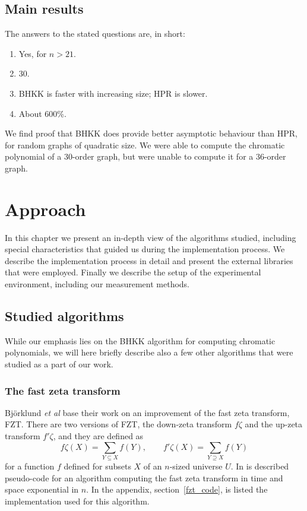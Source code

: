 \documentclass{cslthse-msc}
\begin{document}
\section{Main results}
The answers to the stated questions are, in short:

\begin{enumerate}
 \item Yes, for $n > 21$.
 \item 30.
 \item BHKK is faster with increasing size; HPR is slower.
 \item About 600\%.
\end{enumerate}

We find proof that BHKK does provide better asymptotic behaviour than HPR, for random graphs of quadratic size. We were able to compute the chromatic polynomial of a 30-order graph, but were unable to compute it for a 36-order graph.

\chapter{Approach}
In this chapter we present an in-depth view of the algorithms studied, including special characteristics that guided us during the implementation process. We describe the implementation process in detail and present the external libraries that were employed. Finally we describe the setup of the experimental environment, including our measurement methods.


\section{Studied algorithms}
While our emphasis lies on the BHKK algorithm for computing chromatic polynomials, we will here briefly describe also a few other algorithms that were studied as a part of our work.

\subsection{The fast zeta transform}\label{fzt_algorithm}
Björklund \emph{et al} \cite{cov_pack} base their work on an improvement of the fast zeta transform, FZT. There are two versions of FZT, the down-zeta transform $f\zeta$ and the up-zeta transform $f'\zeta$, and they are defined as
\[
 f\zeta(X) = \sum_{Y \subseteq X} f(Y), \qquad f'\zeta(X) = \sum_{Y \supseteq X} f(Y)
\]
for a function $f$ defined for subsets $X$ of an $n$-sized universe $U$. In \cite[p.5]{cov_pack} is described pseudo-code for an algorithm computing the fast zeta transform in time and space exponential in $n$. In the appendix, section~\ref{fzt_code}, is listed the implementation used for this algorithm.
\end{document}

